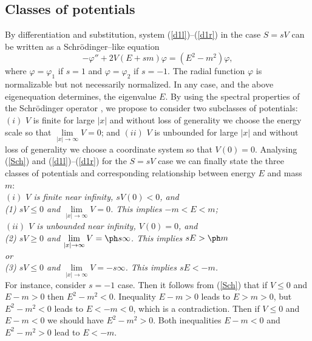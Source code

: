 \documentclass[amsmath,amssymb,superscriptaddress,showkeys, showpacs, aps, nofootinbib]{revtex4}
\begin{document}
\subsection{Classes of potentials}
By differentiation and substitution, system (\ref{d1l})--(\ref{d1r}) in the case $S=sV$ can be written as a Schr\"{o}dinger--like equation
\begin{equation}\label{Sch}
-\varphi '' + 2V(E+sm)\varphi=(E^2-m^2)\varphi,
\end{equation}
where $\varphi=\varphi_1$ if $s=1$ and $\varphi=\varphi_2$ if $s=-1$. The radial function $\varphi$ is normalizable but not necessarily normalized. In any case, and the above eigenequation determines, the eigenvalue $E$. By using the spectral properties of the Schr\"{o}dinger operator \cite{Reed}, we propose 
to consider two subclasses of potentials: $(i)$ $V$ is finite for large $|x|$ and without loss of generality we choose the energy scale so that $\lim\limits_{|x|\to\infty}V=0$; and $(ii)$ $V$ is unbounded for large $|x|$ and without loss of generality we choose a coordinate system so that $V(0)=0$. Analysing (\ref{Sch}) and (\ref{d1l})--(\ref{d1r}) for the $S=sV$ case we can finally state the three classes of potentials and corresponding relationship between energy $E$ and mass $m$:\\ 

{\it $(i)$ $V$ is finite near infinity, $sV(0)<0$, and\\

\hspace{3cm} (1) $sV\le 0$ and $\lim\limits_{|x|\to\infty}V=0$. This implies $-m<E<m$;\\

$(ii)$ $V$ is unbounded near infinity, $V(0)=0$, and\\

\hspace{3cm} (2) $sV\ge 0$ and $\lim\limits_{|x|\to\infty}V=\ph s\infty$. This implies $sE>\ph m$\\

or\\

\hspace{3cm} (3) $sV\le 0$ and $\lim\limits_{|x|\to\infty}V=-s\infty$. This implies $sE<-m$.}\\

For instance, consider $s=-1$ case. Then it follows from (\ref{Sch}) that if $V\le 0$ and $E-m>0$ then $E^2-m^2<0$. Inequality $E-m>0$ leads to $E>m>0$, but $E^2-m^2<0$ leads to $E<-m<0$, which is a contradiction. Then if $V\le 0$ and $E-m<0$ we should have $E^2-m^2>0$. Both inequalities $E-m<0$ and $E^2-m^2>0$ lead to $E<-m$. 
\end{document}
